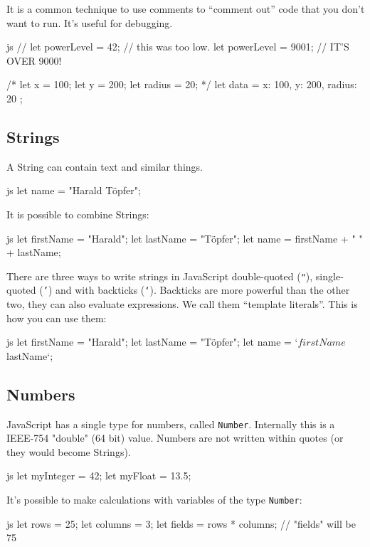\documentclass[10pt,a4paper]{article}
\begin{document}
\begin{multicols}{3}
It is a common technique to use comments to \enquote{comment out} code that you don't want to run. It's useful for debugging.
\begin{codebox}{js}{}
  // let powerLevel = 42; // this was too low.
  let powerLevel = 9001; // IT'S OVER 9000!

  /*
  let x = 100;
  let y = 200;
  let radius = 20;
  */
  let data = {
    x: 100,
    y: 200,
    radius: 20
  };
\end{codebox}

\subsection*{Strings}
A String can contain text and similar things.
\begin{codebox}{js}{}
  let name = "Harald Töpfer";
\end{codebox}
It is possible to combine Strings:
\begin{codebox}{js}{}
  let firstName = "Harald";
  let lastName = "Töpfer";
  let name = firstName + " " + lastName;
\end{codebox}

There are three ways to write strings in JavaScript double-quoted (\texttt{"}), single-quoted (\texttt{'}) and with backticks (\texttt{`}). Backticks are more powerful than the other two, they can also evaluate expressions. We call them \enquote{template literals}. This is how you can use them:
\begin{codebox}{js}{}
  let firstName = "Harald";
  let lastName = "Töpfer";
  let name = `${firstName} ${lastName}`;
\end{codebox}

\subsection*{Numbers}
JavaScript has a single type for numbers, called \texttt{Number}. Internally this is a IEEE-754 "double" (64 bit) value. Numbers are not written within quotes (or they would become Strings).

\begin{codebox}{js}{}
  let myInteger = 42;
  let myFloat = 13.5;
\end{codebox}
It's possible to make calculations with variables of the type \texttt{Number}:
\begin{codebox}{js}{}
  let rows = 25;
  let columns = 3;
  let fields = rows * columns; // "fields" will be 75
\end{codebox}


\end{multicols}
\end{document}
